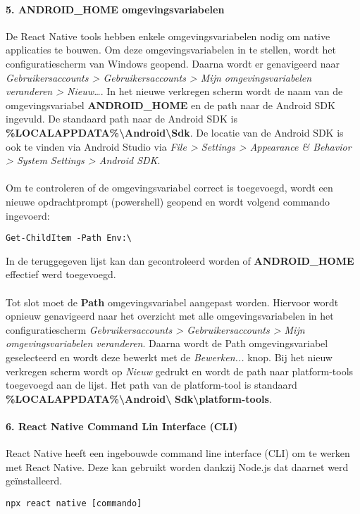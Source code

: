 \paragraph{5. ANDROID\_HOME omgevingsvariabelen}
De React Native tools hebben enkele omgevingsvariabelen nodig om native applicaties te bouwen. 
Om deze omgevingsvariabelen in te stellen, wordt het configuratiescherm van Windows geopend. 
Daarna wordt er genavigeerd naar
\textit{Gebruikersaccounts > Gebruikersaccounts > Mijn omgevingsvariabelen veranderen > Nieuw\dots}. 
In het nieuwe verkregen scherm wordt de naam van de omgevingsvariabel \textbf{ANDROID\_HOME} 
en de path naar de Android SDK ingevuld. De standaard path naar de Android SDK is 
\textbf{\%LOCALAPPDATA\%\backslash Android\backslash Sdk}. 
De locatie van de Android SDK is ook te vinden via Android Studio via 
\textit{File > Settings > Appearance \& Behavior > System Settings > Android SDK}.
\\\\
Om te controleren of de omgevingsvariabel correct is toegevoegd, wordt een nieuwe 
opdrachtprompt (powershell) geopend en wordt volgend commando ingevoerd:
\begin{verbatim}
Get-ChildItem -Path Env:\
\end{verbatim}
In de teruggegeven lijst kan dan gecontroleerd worden of \textbf{ANDROID\_HOME} effectief werd toegevoegd.
\\\\
Tot slot moet de \textbf{Path} omgevingsvariabel aangepast worden. 
Hiervoor wordt opnieuw genavigeerd naar het overzicht met alle omgevingsvariabelen in het configuratiescherm 
\textit{Gebruikersaccounts > Gebruikersaccounts > Mijn omgevingsvariabelen veranderen}. 
Daarna wordt de Path omgevingsvariabel geselecteerd en wordt deze bewerkt met de \textit{Bewerken...} knop. 
Bij het nieuw verkregen scherm wordt op \textit{Nieuw} gedrukt en wordt de path naar platform-tools 
toegevoegd aan de lijst. Het path van de platform-tool is standaard 
\textbf{\%LOCALAPPDATA\%\backslash Android\backslash} \textbf{Sdk\backslash platform-tools}.

\paragraph{6. React Native Command Lin Interface (CLI)}
React Native heeft een ingebouwde command line interface (CLI) om te werken met React Native. 
Deze kan gebruikt worden dankzij Node.js dat daarnet werd geïnstalleerd.
\begin{verbatim}
npx react native [commando]
\end{verbatim}

